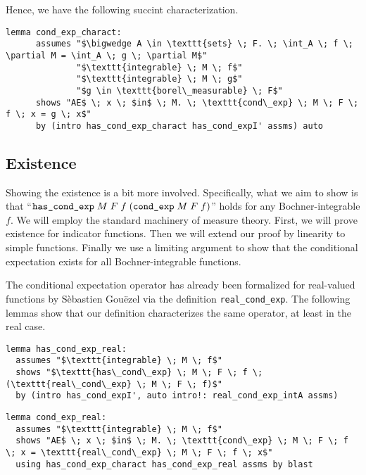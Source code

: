 Hence, we have the following succint characterization.

\begin{isalemma}
{\small
	\begin{lstlisting}[style=isabelle]
	lemma cond_exp_charact:
	  assumes "$\bigwedge A \in \texttt{sets} \; F. \; \int_A \; f \; \partial M = \int_A \; g \; \partial M$"
			  "$\texttt{integrable} \; M \; f$"
			  "$\texttt{integrable} \; M \; g$"
			  "$g \in \texttt{borel\_measurable} \; F$"
	  shows "AE$ \; x \; $in$ \; M. \; \texttt{cond\_exp} \; M \; F \; f \; x = g \; x$"
	  by (intro has_cond_exp_charact has_cond_expI' assms) auto
	\end{lstlisting}
}
\end{isalemma}

\subsection{Existence}

Showing the existence is a bit more involved. Specifically, what we aim to show is that ``$\normalfont\texttt{has\_cond\_exp} \; M \; F \; f \; (\texttt{cond\_exp} \; M \; F \; f)$'' holds for any Bochner-integrable $f$. We will employ the standard machinery of measure theory. First, we will prove existence for indicator functions. Then we will extend our proof by linearity to simple functions. Finally we use a limiting argument to show that the conditional expectation exists for all Bochner-integrable functions.

The conditional expectation operator has already been formalized for real-valued functions by S\`ebastien Gou\"ezel via the definition \texttt{real\_cond\_exp}. The following lemmas show that our definition characterizes the same operator, at least in the real case.

\begin{isalemma}
{\small
	\begin{lstlisting}[style=isabelle]
lemma has_cond_exp_real:
  assumes "$\texttt{integrable} \; M \; f$"
  shows "$\texttt{has\_cond\_exp} \; M \; F \; f \; (\texttt{real\_cond\_exp} \; M \; F \; f)$"
  by (intro has_cond_expI', auto intro!: real_cond_exp_intA assms)
	\end{lstlisting}
}
\end{isalemma}

\begin{isalemma}
{\small
	\begin{lstlisting}[style=isabelle]
lemma cond_exp_real:
  assumes "$\texttt{integrable} \; M \; f$"
  shows "AE$ \; x \; $in$ \; M. \; \texttt{cond\_exp} \; M \; F \; f \; x = \texttt{real\_cond\_exp} \; M \; F \; f \; x$" 
  using has_cond_exp_charact has_cond_exp_real assms by blast
	\end{lstlisting}
}
\end{isalemma}

